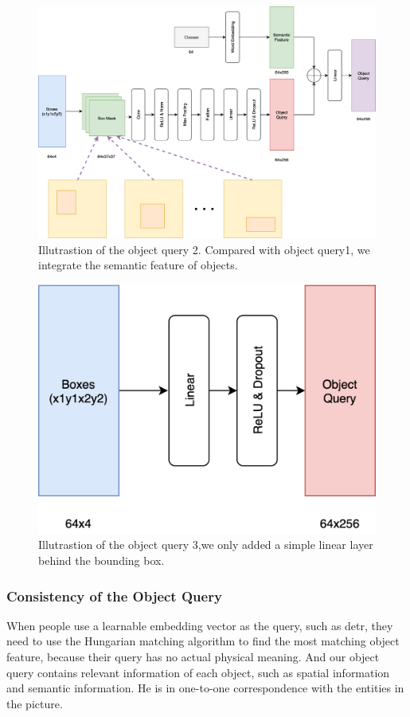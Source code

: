 \begin{figure}[tbph!]
	\centering
	\includegraphics[width=0.8\linewidth]{figures/obj_query1}
	\caption[Illutrastion of the object query 2]{Illutrastion of the object query 2. Compared with object query1, we integrate the semantic feature of objects.}
	\label{fig:objquery1}
\end{figure}

\begin{figure}[tbph!]
	\centering
	\includegraphics[width=0.5\linewidth]{figures/obj_query2}
	\caption[Illutrastion of the object query 3]{Illutrastion of the object query 3,we only added a simple linear layer behind the bounding box.}
	\label{fig:objquery2}
\end{figure}

\subsubsection{Consistency of the Object Query }

When people use a learnable embedding vector as the query, such as detr, they need to use the Hungarian matching algorithm to find the most matching object feature, because their query has no actual physical meaning. And our object query contains relevant information of each object, such as spatial information and semantic information. He is in one-to-one correspondence with the entities in the picture.

